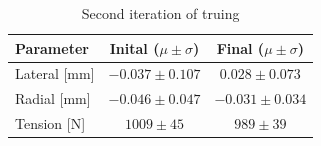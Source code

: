 \documentclass[journal]{IEEEtran}
\begin{document}
\begin{table}[!t]
\caption{Second iteration of truing}
\label{tbl:exp3}
\centering
\begin{tabular}{| l | c | c |}
    \hline
    Parameter & Inital ($\mu \pm \sigma$) & Final ($\mu \pm \sigma$)\\ \hline
    Lateral [mm] & $-0.037\pm0.107$ &$0.028\pm 0.073$ \\ \hline 
    Radial [mm] &$-0.046\pm0.047$& $-0.031\pm0.034$ \\ \hline 
    Tension [N] &$1009\pm45$& $989\pm39$ \\ \hline 
\end{tabular}
\end{table}





%
%

\end{document}
